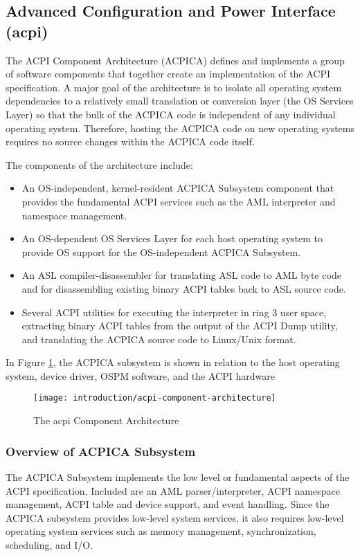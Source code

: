 \subsection{Advanced Configuration and Power Interface (\gls{acpi})}
The ACPI Component Architecture (ACPICA) defines and implements a group of software
components that together create an implementation of the ACPI specification. A major goal of the
architecture is to isolate all operating system dependencies to a relatively small translation or
conversion layer (the OS Services Layer) so that the bulk of the ACPICA code is independent of
any individual operating system. Therefore, hosting the ACPICA code on new operating systems
requires no source changes within the ACPICA code itself.

The components of the architecture include:
\begin{itemize}
	\item An OS-independent, kernel-resident ACPICA Subsystem component that provides the fundamental ACPI services such as the AML interpreter and namespace management.
	\item An OS-dependent OS Services Layer for each host operating system to provide OS support for the OS-independent ACPICA Subsystem.
	\item An ASL compiler-disassembler for translating ASL code to AML byte code and for disassembling existing binary ACPI tables back to ASL source code.
	\item Several ACPI utilities for executing the interpreter in ring 3 user space, extracting binary ACPI tables from the output of the ACPI Dump utility, and translating the ACPICA source	code to Linux/Unix format.
\end{itemize}

In Figure \ref{fig:introduction-acpi-component-architecture}, the ACPICA subsystem is shown in relation to the host operating system, device driver, OSPM software, and the ACPI hardware

\begin{figure}[h]
	\centering
	\texttt{[image: introduction/acpi-component-architecture]}
	\caption{The \gls{acpi} Component Architecture}\label{fig:introduction-acpi-component-architecture}
\end{figure}

\subsubsection{Overview of ACPICA Subsystem}
The ACPICA Subsystem implements the low level or fundamental aspects of the ACPI
specification. Included are an AML parser/interpreter, ACPI namespace management, ACPI table
and device support, and event handling. Since the ACPICA subsystem provides low-level system
services, it also requires low-level operating system services such as memory management,
synchronization, scheduling, and I/O.

